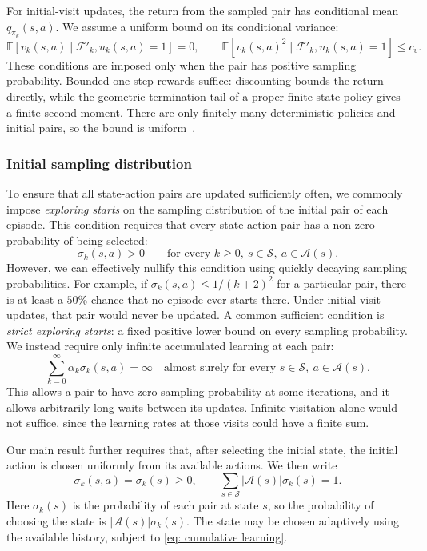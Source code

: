 For initial-visit updates, the return from the sampled pair has conditional mean $q_{\pi_k}(s,a)$. We assume a uniform bound on its conditional variance:
\begin{equation}
\label{eq: return moments}
\mathbb E[v_k(s,a)\mid\mathcal F'_k,u_k(s,a)=1]=0,
\qquad
\mathbb E[v_k(s,a)^2\mid\mathcal F'_k,u_k(s,a)=1]\le c_v.
\end{equation}
These conditions are imposed only when the pair has positive sampling probability. Bounded one-step rewards suffice: discounting bounds the return directly, while the geometric termination tail of a proper finite-state policy gives a finite second moment. There are only finitely many deterministic policies and initial pairs, so the bound is uniform~\citep[Section~2.2.1]{Bertsekas1996Neuro-DynamicProgramming}.

\subsubsection{Initial sampling distribution}

To ensure that all state-action pairs are updated sufficiently often, we commonly impose \textit{exploring starts} on the sampling distribution of the initial pair of each episode. This condition requires that every state-action pair has a non-zero probability of being selected:
\[
\sigma_k(s,a)>0\qquad\text{for every }k\ge0,\ s\in\mathcal S,\ a\in\mathcal A(s).
\]
However, we can effectively nullify this condition using quickly decaying sampling probabilities.
For example, if $\sigma_k(s,a)\le1/(k+2)^2$ for a particular pair, there is at least a $50\%$ chance that no episode ever starts there. Under initial-visit updates, that pair would never be updated.
A common sufficient condition is \textit{strict exploring starts}: a fixed positive lower bound on every sampling probability. We instead require only infinite accumulated learning at each pair:
\begin{equation}
\label{eq: cumulative learning}
\sum_{k=0}^{\infty}\alpha_k\sigma_k(s,a)=\infty
\quad\text{almost surely for every }s\in\mathcal S,\ a\in\mathcal A(s).
\end{equation}
This allows a pair to have zero sampling probability at some iterations, and it allows arbitrarily long waits between its updates. Infinite visitation alone would not suffice, since the learning rates at those visits could have a finite sum.

Our main result further requires that, after selecting the initial state, the initial action is chosen uniformly from its available actions. We then write
\begin{equation}
\label{eq: uniform starts}
\sigma_k(s,a)=\sigma_k(s)\ge0,
\qquad
\sum_{s\in\mathcal S}|\mathcal A(s)|\sigma_k(s)=1.
\end{equation}
Here $\sigma_k(s)$ is the probability of each pair at state $s$, so the probability of choosing the state is $|\mathcal A(s)|\sigma_k(s)$. The state may be chosen adaptively using the available history, subject to \eqref{eq: cumulative learning}.

